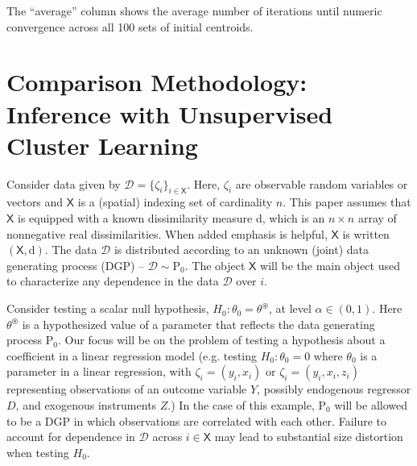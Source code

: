 \documentclass[preprint]{imsart}
\numberwithin{equation}{section}
\theoremstyle{plain}
\theoremstyle{definition}
\renewcommand{\(}{\left(}
\renewcommand{\)}{\right)}
\renewcommand{\[}{\left[}
\renewcommand{\]}{\right]}
\renewcommand{\Pr}{{\mathrm{P}}}
\begin{document}
{\begin{table}[ht!]
\begin{threeparttable}
\begin{tablenotes}
The ``average'' column shows the average number of iterations until numeric convergence across all 100 sets of initial centroids. 
\end{tablenotes}
\end{threeparttable}
\end{table}



\section{Comparison Methodology: Inference with Unsupervised Cluster Learning}
\label{method}



Consider data given by $\mathscr D = \{ \zeta_i \}_{i \in \mathsf X}$.  Here, $\zeta_i$ are observable random variables or vectors and $\mathsf X$ is a (spatial) indexing set of cardinality $n$.  This paper assumes that $\mathsf X$ is equipped with a known dissimilarity measure $\mathrm d$, which is an $n \times n$ array of nonnegative real dissimilarities.  When added emphasis is helpful, $\mathsf X$ is written $(\mathsf X,\mathrm d)$.  The data $\mathscr D$ is distributed according to an unknown (joint) data generating process (DGP) -- $\mathscr D \sim \Pr_0$.  The object $\mathsf X$ will be the main object used to characterize any dependence in the data $\mathscr D$ over $i$.  

Consider testing a scalar null hypothesis, $H_0: \theta_0 = \theta^{\circledast}$, at level $\alpha \in (0,1)$.  Here $\theta^{\circledast}$ is a hypothesized value of a parameter that reflects the data generating process $\Pr_0$.  Our focus will be on the problem of testing a hypothesis about a coefficient in a linear regression model (e.g. testing $H_0:\theta_0=0$ where $\theta_0$ is a parameter in a linear regression, with $\zeta_i = (y_i, x_i)$ or $\zeta_i = (y_i, x_i, z_i)$ representing observations of an outcome variable $Y$, possibly endogenous regressor $D$, and exogenous instruments $Z$.) In the case of this example, $\Pr_0$ will be allowed to be a DGP in which observations are correlated with each other.  Failure to account for dependence in $\mathscr D$ across $i \in \mathsf X$ may lead to substantial size distortion when testing $H_0$. %


}
\end{document}
